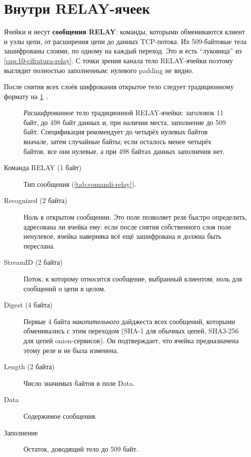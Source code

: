 \section{Внутри RELAY-ячеек}\label{sec:relay}

Ячейки  и  несут \textbf{сообщения RELAY}: команды, которыми обмениваются клиент и узлы цепи, от расширения цепи до данных TCP-потока. Их 509-байтовые тела зашифрованы слоями, по одному на каждый переход. Это и есть \enquote{луковица} из \cref{cap:10-cifratura-relay}. С точки зрения канала тело RELAY-ячейки поэтому выглядит полностью заполненным: нулевого padding не видно.

После снятия всех слоёв шифрования открытое тело следует традиционному формату на \cref{fig:relay}~.

\begin{figure}[htbp]
\centering

\caption{\emph{Расшифрованное} тело традиционной RELAY-ячейки: заголовок 11 байт, до 498 байт данных и, при наличии места, заполнение до 509 байт. Спецификация рекомендует до четырёх нулевых байтов вначале, затем случайные байты; если осталось менее четырёх байтов, все они нулевые, а при 498 байтах данных заполнения нет.}
\label{fig:relay}
\end{figure}

\begin{description}
  \item[Команда RELAY (1 байт)] Тип сообщения (\cref{tab:comandi-relay}).
  \item[Recognized (2 байта)] Ноль в открытом сообщении. Это поле позволяет реле быстро определить, адресована ли ячейка ему: если после снятия собственного слоя поле ненулевое, ячейка наверняка всё ещё зашифрована и должна быть переслана.
  \item[StreamID (2 байта)] Поток, к которому относится сообщение, выбранный клиентом; ноль для сообщений о цепи в целом.
  \item[Digest (4 байта)] Первые 4 байта \emph{накопительного} дайджеста всех сообщений, которыми обменивались с этим переходом (SHA-1 для обычных цепей, SHA3-256 для цепей onion-сервисов). Он подтверждает, что ячейка предназначена этому реле и не была изменена.
  \item[Length (2 байта)] Число значимых байтов в поле Data.
  \item[Data] Содержимое сообщения.
  \item[Заполнение] Остаток, доводящий тело до 509 байт.
\end{description}

